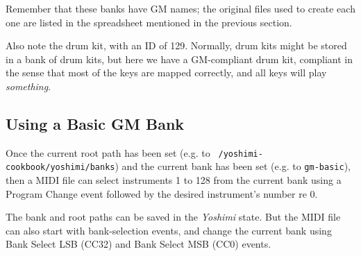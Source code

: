    Remember that these banks have GM names; the original files used to
   create each one are listed in the spreadsheet mentioned in the previous
   section.

   Also note the drum kit, with an ID of 129.  Normally, drum kits might be
   stored in a bank of drum kits, but here we have a GM-compliant drum kit,
   compliant in the sense that most of the keys are mapped correctly, and
   all keys will play \textsl{something}.

\subsection{Using a Basic GM Bank}
\label{subsec:cookbook_banks_using_basic_bank}

   Once the current root path has been set (e.g. to
   \texttt{~/yoshimi-cookbook/yoshimi/banks}) and
   the current bank has been set (e.g. to \texttt{gm-basic}),
   then a MIDI file can select instruments 1 to 128 from the
   current bank using a Program Change event followed by the desired
   instrument's number re 0.

   The bank and root paths can be saved in the \textsl{Yoshimi} state.
   But the MIDI file can also start with bank-selection events, and change
   the current bank using Bank Select LSB (CC32) and Bank Select MSB (CC0)
   events.

